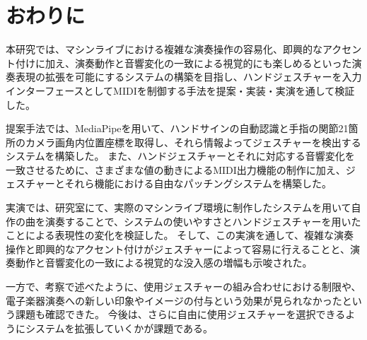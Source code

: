 \section{おわりに}

本研究では、マシンライブにおける複雑な演奏操作の容易化、即興的なアクセント付けに加え、演奏動作と音響変化の一致による視覚的にも楽しめるといった演奏表現の拡張を可能にするシステムの構築を目指し、ハンドジェスチャーを入力インターフェースとしてMIDIを制御する手法を提案・実装・実演を通して検証した。

提案手法では、MediaPipeを用いて、ハンドサインの自動認識と手指の関節21箇所のカメラ画角内位置座標を取得し、それら情報よってジェスチャーを検出するシステムを構築した。
また、ハンドジェスチャーとそれに対応する音響変化を一致させるために、さまざまな値の動きによるMIDI出力機能の制作に加え、ジェスチャーとそれら機能における自由なパッチングシステムを構築した。

実演では、研究室にて、実際のマシンライブ環境に制作したシステムを用いて自作の曲を演奏することで、システムの使いやすさとハンドジェスチャーを用いたことによる表現性の変化を検証した。
そして、この実演を通して、複雑な演奏操作と即興的なアクセント付けがジェスチャーによって容易に行えることと、演奏動作と音響変化の一致による視覚的な没入感の増幅も示唆された。

一方で、考察で述べたように、使用ジェスチャーの組み合わせにおける制限や、電子楽器演奏への新しい印象やイメージの付与という効果が見られなかったという課題も確認できた。
今後は、さらに自由に使用ジェスチャーを選択できるようにシステムを拡張していくかが課題である。

